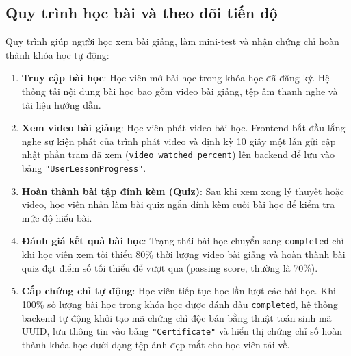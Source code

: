 \documentclass[../DoAn.tex]{subfiles}
\begin{document}
\subsection{Quy trình học bài và theo dõi tiến độ}
Quy trình giúp người học xem bài giảng, làm mini-test và nhận chứng chỉ hoàn thành khóa học tự động:
\begin{enumerate}
    \item \textbf{Truy cập bài học}: Học viên mở bài học trong khóa học đã đăng ký. Hệ thống tải nội dung bài học bao gồm video bài giảng, tệp âm thanh nghe và tài liệu hướng dẫn.
    \item \textbf{Xem video bài giảng}: Học viên phát video bài học. Frontend bắt đầu lắng nghe sự kiện phát của trình phát video và định kỳ 10 giây một lần gửi cập nhật phần trăm đã xem (\texttt{video\_watched\_percent}) lên backend để lưu vào bảng \texttt{"UserLessonProgress"}.
    \item \textbf{Hoàn thành bài tập đính kèm (Quiz)}: Sau khi xem xong lý thuyết hoặc video, học viên nhấn làm bài quiz ngắn đính kèm cuối bài học để kiểm tra mức độ hiểu bài.
    \item \textbf{Đánh giá kết quả bài học}: Trạng thái bài học chuyển sang \texttt{completed} chỉ khi học viên xem tối thiểu 80\% thời lượng video bài giảng và hoàn thành bài quiz đạt điểm số tối thiểu để vượt qua (passing score, thường là 70\%).
    \item \textbf{Cấp chứng chỉ tự động}: Học viên tiếp tục học lần lượt các bài học. Khi 100\% số lượng bài học trong khóa học được đánh dấu \texttt{completed}, hệ thống backend tự động khởi tạo mã chứng chỉ độc bản bằng thuật toán sinh mã UUID, lưu thông tin vào bảng \texttt{"Certificate"} và hiển thị chứng chỉ số hoàn thành khóa học dưới dạng tệp ảnh đẹp mắt cho học viên tải về.
\end{enumerate}
\end{document}
